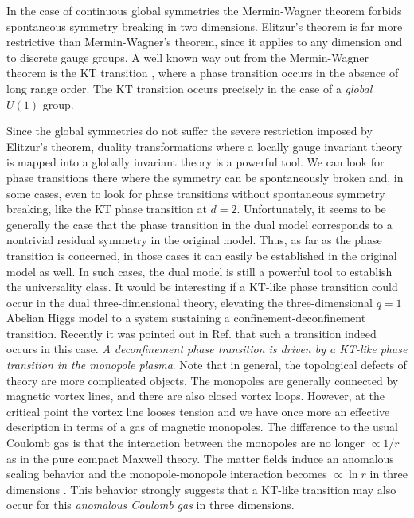 \documentclass[a4paper,showpacs,preprintnumbers,amsmath,amssymb,prl,twocolumn]{revtex4}
\begin{document}
In the case of continuous global symmetries the Mermin-Wagner theorem 
\cite{MW} forbids spontaneous symmetry breaking in two dimensions. 
Elitzur's theorem is far more restrictive than Mermin-Wagner's theorem, 
since it applies to any dimension and to discrete gauge groups. A well 
known way out from the Mermin-Wagner theorem is the KT transition 
\cite{KT}, where a phase transition occurs in the absence of long range 
order. The KT transition occurs precisely in the case of a {\it global} 
$U(1)$ group. 

Since the global symmetries do not suffer the severe restriction 
imposed by Elitzur's theorem, duality transformations where a locally 
gauge invariant theory is mapped into a globally invariant theory is a 
powerful tool. We can look for phase transitions there where the symmetry 
can be spontaneously broken and, in some cases, even to look 
for phase transitions without spontaneous symmetry breaking, 
like the KT phase transition at $d=2$. Unfortunately, 
it seems to be generally the case that the phase transition 
in the dual model corresponds to a nontrivial residual 
symmetry in the original model. Thus, as far as the phase 
transition is concerned, in those cases it can easily be established 
in the original model as well. In such cases, the dual model is still  
a powerful tool to establish the universality class. It would 
be interesting if a KT-like phase transition could occur in the dual 
three-dimensional theory, elevating  the three-dimensional $q=1$ Abelian 
Higgs model to a system sustaining a confinement-deconfinement transition. 
Recently it was pointed out in Ref. \cite{KNS} that such a transition 
indeed occurs in this case. {\it A deconfinement phase transition is 
driven by a KT-like phase transition in the monopole plasma}. 
Note that in general, the topological defects of theory are more 
complicated objects. The monopoles are generally connected 
by magnetic vortex lines, and there are also closed vortex 
loops. However, at the critical point the vortex line looses 
tension and we have once more an effective description in terms of 
a gas of magnetic monopoles. The difference to the usual Coulomb 
gas is that the interaction between the monopoles are no longer 
$\propto 1/r$ as in the pure compact Maxwell theory. The matter 
fields induce an anomalous scaling behavior and the monopole-monopole 
interaction becomes $\propto\ln r$ in three dimensions \cite{KNS,KNS1}. 
This behavior strongly suggests that a KT-like transition may also 
occur for this {\it anomalous Coulomb gas} in three dimensions. 
\end{document}
